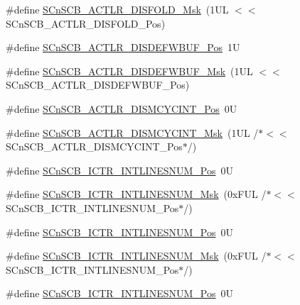 \begin{DoxyCompactItemize}
\item 
\#define \hyperlink{group___c_m_s_i_s___s_cn_s_c_b_gaa9dd2d4a2350499188f438d0aa9fd982}{S\+Cn\+S\+C\+B\+\_\+\+A\+C\+T\+L\+R\+\_\+\+D\+I\+S\+F\+O\+L\+D\+\_\+\+Msk}~(1\+U\+L $<$$<$ S\+Cn\+S\+C\+B\+\_\+\+A\+C\+T\+L\+R\+\_\+\+D\+I\+S\+F\+O\+L\+D\+\_\+\+Pos)
\item 
\#define \hyperlink{group___c_m_s_i_s___s_cn_s_c_b_gafa2eb37493c0f8dae77cde81ecf80f77}{S\+Cn\+S\+C\+B\+\_\+\+A\+C\+T\+L\+R\+\_\+\+D\+I\+S\+D\+E\+F\+W\+B\+U\+F\+\_\+\+Pos}~1U
\item 
\#define \hyperlink{group___c_m_s_i_s___s_cn_s_c_b_ga6cda7b7219232a008ec52cc8e89d5d08}{S\+Cn\+S\+C\+B\+\_\+\+A\+C\+T\+L\+R\+\_\+\+D\+I\+S\+D\+E\+F\+W\+B\+U\+F\+\_\+\+Msk}~(1\+U\+L $<$$<$ S\+Cn\+S\+C\+B\+\_\+\+A\+C\+T\+L\+R\+\_\+\+D\+I\+S\+D\+E\+F\+W\+B\+U\+F\+\_\+\+Pos)
\item 
\#define \hyperlink{group___c_m_s_i_s___s_cn_s_c_b_gaaa3e79f5ead4a32c0ea742b2a9ffc0cd}{S\+Cn\+S\+C\+B\+\_\+\+A\+C\+T\+L\+R\+\_\+\+D\+I\+S\+M\+C\+Y\+C\+I\+N\+T\+\_\+\+Pos}~0U
\item 
\#define \hyperlink{group___c_m_s_i_s___s_cn_s_c_b_ga2a2818f0489ad10b6ea2964e899d4cbc}{S\+Cn\+S\+C\+B\+\_\+\+A\+C\+T\+L\+R\+\_\+\+D\+I\+S\+M\+C\+Y\+C\+I\+N\+T\+\_\+\+Msk}~(1\+U\+L /$\ast$$<$$<$ S\+Cn\+S\+C\+B\+\_\+\+A\+C\+T\+L\+R\+\_\+\+D\+I\+S\+M\+C\+Y\+C\+I\+N\+T\+\_\+\+Pos$\ast$/)
\item 
\#define \hyperlink{group___c_m_s_i_s___s_cn_s_c_b_ga0777ddf379af50f9ca41d40573bfffc5}{S\+Cn\+S\+C\+B\+\_\+\+I\+C\+T\+R\+\_\+\+I\+N\+T\+L\+I\+N\+E\+S\+N\+U\+M\+\_\+\+Pos}~0U
\item 
\#define \hyperlink{group___c_m_s_i_s___s_cn_s_c_b_ga3efa0f5210051464e1034b19fc7b33c7}{S\+Cn\+S\+C\+B\+\_\+\+I\+C\+T\+R\+\_\+\+I\+N\+T\+L\+I\+N\+E\+S\+N\+U\+M\+\_\+\+Msk}~(0x\+F\+U\+L /$\ast$$<$$<$ S\+Cn\+S\+C\+B\+\_\+\+I\+C\+T\+R\+\_\+\+I\+N\+T\+L\+I\+N\+E\+S\+N\+U\+M\+\_\+\+Pos$\ast$/)
\item 
\#define \hyperlink{group___c_m_s_i_s___s_cn_s_c_b_ga0777ddf379af50f9ca41d40573bfffc5}{S\+Cn\+S\+C\+B\+\_\+\+I\+C\+T\+R\+\_\+\+I\+N\+T\+L\+I\+N\+E\+S\+N\+U\+M\+\_\+\+Pos}~0U
\item 
\#define \hyperlink{group___c_m_s_i_s___s_cn_s_c_b_ga3efa0f5210051464e1034b19fc7b33c7}{S\+Cn\+S\+C\+B\+\_\+\+I\+C\+T\+R\+\_\+\+I\+N\+T\+L\+I\+N\+E\+S\+N\+U\+M\+\_\+\+Msk}~(0x\+F\+U\+L /$\ast$$<$$<$ S\+Cn\+S\+C\+B\+\_\+\+I\+C\+T\+R\+\_\+\+I\+N\+T\+L\+I\+N\+E\+S\+N\+U\+M\+\_\+\+Pos$\ast$/)
\item 
\#define \hyperlink{group___c_m_s_i_s___s_cn_s_c_b_ga0777ddf379af50f9ca41d40573bfffc5}{S\+Cn\+S\+C\+B\+\_\+\+I\+C\+T\+R\+\_\+\+I\+N\+T\+L\+I\+N\+E\+S\+N\+U\+M\+\_\+\+Pos}~0U

\end{DoxyCompactItemize}

